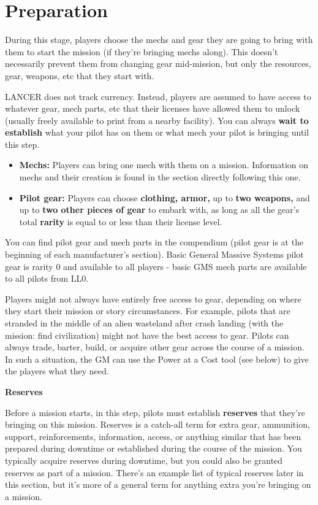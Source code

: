 \section{Preparation}

During this stage, players choose the mechs and gear they are going to bring with them to start the mission (if they're bringing mechs along). This doesn't necessarily prevent them from changing gear mid-mission, but only the resources, gear, weapons, etc that they start with.

LANCER does not track currency. Instead, players are assumed to have access to whatever gear, mech parts, etc that their licenses have allowed them to unlock (usually freely available to print from a nearby facility). You can always \textbf{wait to establish} what your pilot has on them or what mech your pilot is bringing until this step.

\begin{itemize}
\item \textbf{Mechs:} Players can bring one mech with them on a mission. Information on mechs and their creation is found in the section directly following this one.
\item \textbf{Pilot gear:} Players can choose \textbf{clothing, armor,} up to \textbf{two weapons,} and up to \textbf{two other pieces of gear} to embark with, as long as all the gear's total \textbf{rarity} is equal to or less than their license level.
\end{itemize}  
You can find pilot gear and mech parts in the compendium (pilot gear is at the beginning of each manufacturer's section). Basic General Massive Systems pilot gear is rarity 0 and available to all players - basic GMS mech parts are available to all pilots from LL0.

Players might not always have entirely free access to gear, depending on where they start their mission or story circumstances. For example, pilots that are stranded in the middle of an alien wasteland after crash landing (with the mission: find civilization) might not have the best access to gear. Pilots can always trade, barter, build, or acquire other gear across the course of a mission. In such a situation, the GM can use the Power at a Cost tool (see below) to give the
players what they need.

\begin{center}
\textbf{Reserves}
\end{center}

Before a mission starts, in this step, pilots must establish \textbf{reserves} that they're bringing on this mission. Reserves is a catch-all term for extra gear, ammunition, support, reinforcements, information, access, or anything similar that has been prepared during downtime or established during the course of the mission. You typically acquire reserves during downtime, but you could also be granted reserves as part of a mission. There's an example list of typical reserves later in this section, but it's more of a general term for anything extra you're bringing on a mission.
